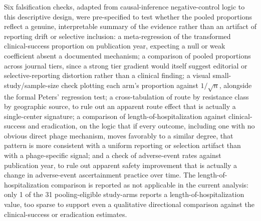 Six falsification checks, adapted from causal-inference negative-control logic to this descriptive design, were pre-specified to test whether the pooled proportions reflect a genuine, interpretable summary of the evidence rather than an artifact of reporting drift or selective inclusion: a meta-regression of the transformed clinical-success proportion on publication year, expecting a null or weak coefficient absent a documented mechanism; a comparison of pooled proportions across journal tiers, since a strong tier gradient would itself suggest editorial or selective-reporting distortion rather than a clinical finding; a visual small-study/sample-size check plotting each arm's proportion against $1/\sqrt{n}$, alongside the formal Peters' regression test; a cross-tabulation of route by resistance class by geographic source, to rule out an apparent route effect that is actually a single-center signature; a comparison of length-of-hospitalization against clinical-success and eradication, on the logic that if every outcome, including one with no obvious direct phage mechanism, moves favorably to a similar degree, that pattern is more consistent with a uniform reporting or selection artifact than with a phage-specific signal; and a check of adverse-event rates against publication year, to rule out apparent safety improvement that is actually a change in adverse-event ascertainment practice over time. The length-of-hospitalization comparison is reported as not applicable in the current analysis: only 1 of the 31 pooling-eligible study-arms reports a length-of-hospitalization value, too sparse to support even a qualitative directional comparison against the clinical-success or eradication estimates.
